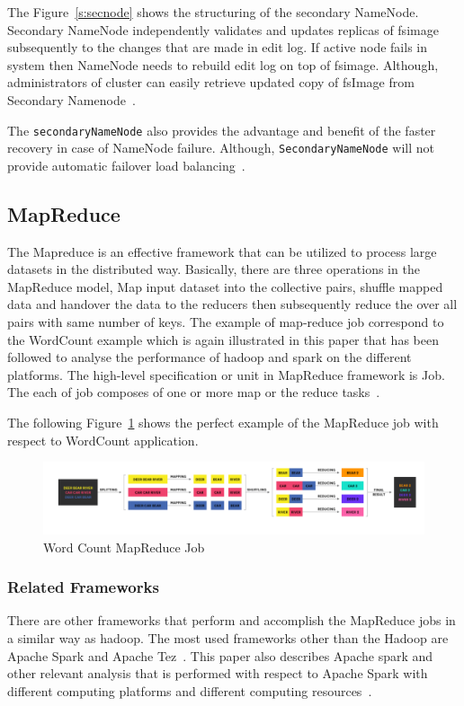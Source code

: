 The Figure~\ref{s:secnode} shows the structuring of the secondary NameNode. 
Secondary NameNode independently validates and 
updates replicas of fsimage subsequently to the changes 
that are made in edit log. If active node fails in
system then NameNode needs to rebuild edit 
log on top of fsimage. Although, administrators of  
cluster can easily retrieve updated copy of
fsImage from Secondary 
Namenode~\cite{hid-sp18-412-hadoop-architecture-overview}.

The \verb|secondaryNameNode| also provides the advantage and 
benefit of the faster recovery in case of NameNode failure. 
Although, \verb|SecondaryNameNode|
will not provide automatic failover 
load balancing~\cite{hid-sp18-412-hadoop-architecture-overview}.


\subsection{MapReduce}
The Mapreduce is an effective framework that can be 
utilized to process large datasets in the distributed way. 
Basically, there are three operations in the MapReduce model, 
Map input dataset into the collective pairs, 
shuffle mapped data and handover the data to the 
reducers then subsequently reduce the over all pairs 
with same number of keys. The example of 
map-reduce job correspond to the WordCount example 
which is again illustrated in this paper that has 
been followed to analyse the performance of hadoop 
and spark on the different platforms. 
The high-level specification or unit in 
MapReduce framework is Job. The each of 
job composes of one or 
more map or the reduce tasks~\cite{hid-sp18-412-hadoop-architecture-overview}. 

The following Figure~\ref{s:mapreduce} 
shows the perfect example of the 
MapReduce job with respect to WordCount application.

\begin{figure}[!ht]
\centering\includegraphics[width=\textwidth]{images/WordCountMapReduce.png}
\caption{Word Count 
MapReduce 
Job~\cite{hid-sp18-412-hadoop-architecture-overview}}\label{s:mapreduce}
\end{figure}

\subsubsection{Related Frameworks}
There are other frameworks that perform and accomplish the 
MapReduce jobs in a similar way as hadoop. 
The most used frameworks 
other than the Hadoop are Apache Spark and Apache Tez~\cite{hid-sp18-412-tez}. 
This paper also describes Apache spark and other relevant 
analysis that is performed with respect to Apache Spark 
with different computing platforms and
different computing resources~\cite{hid-sp18-412-hadoop-architecture-overview}.

